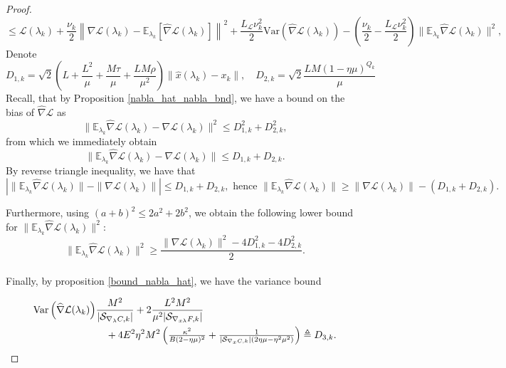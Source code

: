 \documentclass[11pt, twoside]{report}
\begin{document}
\begin{proof}
\begin{equation} \label{Lip_to_sub}
    \leq \mathcal{L}(\lambda_k) + \frac{\nu_k}{2} \left\|\nabla \mathcal{L}(\lambda_k)- \mathbb{E}_{\lambda_k}\left[\widehat{\nabla}\mathcal{L}(\lambda_k)\right]\right\|^2 + \frac{L_{\mathcal{L}}\nu_k^2}{2}\mathrm{Var}(\widehat{\nabla}\mathcal{L}(\lambda_k)) - \left(\frac{\nu_k}{2} - \frac{L_{\mathcal{L}}\nu_k^2}{2}\right) \|\mathbb{E}_{\lambda_k} \widehat{\nabla}\mathcal{L}(\lambda_k)\|^2,
\end{equation}
Denote
\[D_{1,k} = \sqrt{2}\left(L + \frac{L^2}{\mu} + \frac{M\tau}{\mu} + \frac{LM\rho}{\mu^2} \right) \|\hat{x}(\lambda_k) - x_k\|, \quad D_{2,k} = \sqrt{2} \frac{LM(1-\eta \mu)^{Q_k}}{\mu}\]
Recall, that by Proposition \ref{nabla_hat_nabla_bnd}, we have a bound on the bias of $\widehat{\nabla} \mathcal{L}$ as
\begin{equation} \label{T45diff}
    \|\mathbb{E}_{\lambda_k} \widehat{\nabla} \mathcal{L}(\lambda_k) - \nabla \mathcal{L}(\lambda_k)\|^2 \leq D_{1,k}^2  + D_{2,k}^2,
\end{equation}
from which we immediately obtain
\[\|\mathbb{E}_{\lambda_k} \widehat{\nabla} \mathcal{L}(\lambda_k) - \nabla \mathcal{L}(\lambda_k)\| \leq D_{1,k}  + D_{2,k}.\]
By reverse triangle inequality, we have that
\[\left| \|\mathbb{E}_{\lambda_k} \widehat{\nabla} \mathcal{L}(\lambda_k) \| - \|\nabla \mathcal{L}(\lambda_k)\| \right| \leq D_{1,k}+D_{2,k}, \text{ hence } \|\mathbb{E}_{\lambda_k} \widehat{\nabla} \mathcal{L}(\lambda_k) \| \geq \|\nabla \mathcal{L}(\lambda_k)\| -  (D_{1,k}+D_{2,k}).\]

Furthermore, using $(a+b)^2 \leq 2a^2 + 2b^2$, we obtain the following lower bound for $\|\mathbb{E}_{\lambda_k} \widehat{\nabla} \mathcal{L}(\lambda_k) \|^2$:
\begin{equation} \label{Enabhatsq_rev}
    \|\mathbb{E}_{\lambda_k} \widehat{\nabla} \mathcal{L}(\lambda_k) \|^2 \geq \frac{\|\nabla \mathcal{L}(\lambda_k)\|^2 - 4D_{1,k}^2 -4D_{2,k}^2}{2}.
\end{equation}
\\Finally, by proposition \ref{bound_nabla_hat}, we have the variance bound 

\begin{align}
\mathrm{Var}\left( \widehat{\nabla} \mathcal{L}(\lambda_k) \right) 
&\frac{M^2}{|\mathcal{S}_{\nabla_\lambda C,k}|} 
+ 2 \frac{L^2 M^2}{\mu^2|\mathcal{S}_{\nabla_{x\lambda} F,k}|} \,  \notag \\
&\quad + 4E^2\eta^2 M^2 \left( \tfrac{\kappa^2}{B (2 - \eta \mu)^2} 
+ \tfrac{1}{|\mathcal{S}_{\nabla_x C,k}|(2\eta \mu - \eta^2 \mu^2)} \right)
\triangleq D_{3,k}.
\label{varbndthm}
\end{align}



\end{proof}
\end{document}
